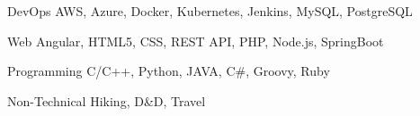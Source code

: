 

\begin{cvskills}

  \cvskill
    {DevOps} %
    {AWS, Azure, Docker, Kubernetes, Jenkins, MySQL, PostgreSQL} %

  \cvskill
    {Web} %
    {Angular, HTML5, CSS, REST API, PHP, Node.js, SpringBoot} %

  \cvskill
    {Programming} %
    {C/C++, Python, JAVA, C\#, Groovy, Ruby} %

  \cvskill
    {Non-Technical} %
    {Hiking, D\&D, Travel} %

\end{cvskills}
